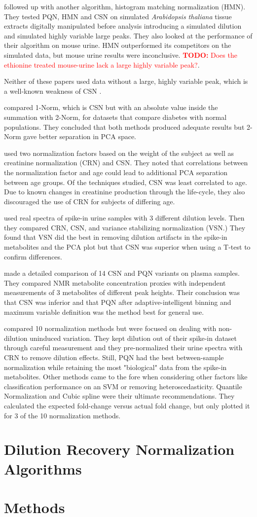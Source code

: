 \documentclass[english]{article}
\newcommand{\todo}[1]{\textcolor{red}{\textbf{TODO:} #1}}
\begin{document}
\citep{Torgrip2008} followed up with another algorithm, histogram matching normalization (HMN). They tested PQN, HMN and CSN on simulated \textit{Arabidopsis thaliana} tissue extracts digitally manipulated before analysis introducing a simulated dilution and simulated highly variable large peaks. They also looked at the performance of their algorithm on mouse urine. HMN outperformed its competitors on the simulated data, but mouse urine results were inconclusive. \todo{Does the ethionine treated mouse-urine lack a large highly variable peak?}.

Neither of these papers used data without a large, highly variable peak, which is a well-known weakness of CSN \citep{VanDenBerg2006}.

\citep{Wen2007} compared 1-Norm, which is CSN but with an absolute value inside the summation with 2-Norm, for datasets that compare diabetes with normal populations. They concluded that both methods produced adequate results but 2-Norm gave better separation in PCA space.

\citep{Schnackenberg2007} used two normalization factors based on the weight of the subject as well as creatinine normalization (CRN) and CSN. They noted that correlations between the normalization factor and age could lead to additional PCA separation between age groups. Of the techniques studied, CSN was least correlated to age. Due to known changes in creatinine production through the life-cycle, they also discouraged the use of CRN for subjects of differing age.

\citep{Zhang2009a} used real spectra of spike-in urine samples with 3 different dilution levels. Then they compared CRN, CSN, and variance stabilizing normalization (VSN.) They found that VSN did the best in removing dilution artifacts in the spike-in metabolites and the PCA plot but that CSN was superior when using a T-test to confirm differences.

\citep{DeMeyer2010a} made a detailed comparison of 14 CSN and PQN variants on plasma samples. They compared NMR metabolite concentration proxies with independent measurements of 3 metabolites of different peak heights. Their conclusion was that CSN was inferior and that PQN after adaptive-intelligent binning and maximum variable definition was the method best for general use.

\citep{Kohl2012} compared 10 normalization methods but were focused on dealing with non-dilution uninduced variation. They kept dilution out of their spike-in dataset through careful measurement and they pre-normalized their urine spectra with CRN to remove dilution effects. Still, PQN had the best between-sample normalization while retaining the most "biological" data from the spike-in metabolites. Other methods came to the fore when considering other factors like classification performance on an SVM or removing heteroscedasticity. Quantile Normalization and Cubic spline were their ultimate recommendations. They calculated the expected fold-change versus actual fold change, but only plotted it for 3 of the 10 normalization methods.

\section{Dilution Recovery Normalization Algorithms}
\section{Methods}



\end{document}
